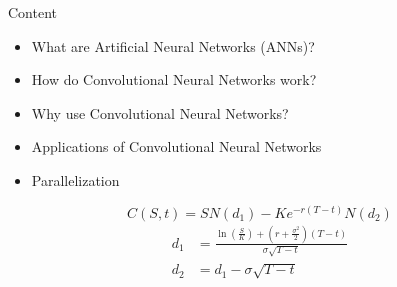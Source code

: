 \begin{frame}{Content}
    \begin{itemize}
        \item What are Artificial Neural Networks (ANNs)?
        \item How do Convolutional Neural Networks work?
        \item Why use Convolutional Neural Networks?
        \item Applications of Convolutional Neural Networks
        \item Parallelization
    \end{itemize}
    \begin{equation}
        C(S, t) = S N(d_1) - K e^{-r (T - t)} N(d_2)
    \end{equation}
    \begin{align*}
        d_1 &= \frac{\ln(\frac{S}{K}) + (r + \frac{\sigma^2}{2}) (T - t)}{\sigma \sqrt{T - t}} \\
        d_2 &= d_1 - \sigma \sqrt{T - t}
    \end{align*}
\end{frame}

